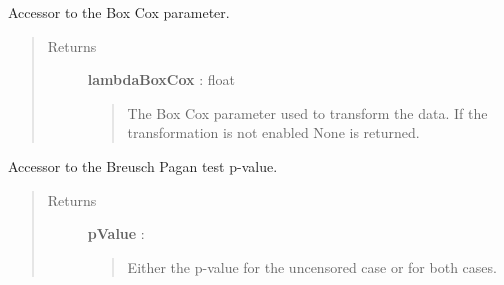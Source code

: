 \documentclass[letterpaper,10pt,english]{sphinxmanual}
\begin{document}
\begin{fulllineitems}
\begin{fulllineitems}
\end{fulllineitems}


\begin{fulllineitems}
\label{_generated/otpod.UnivariateLinearModelAnalysis:otpod.UnivariateLinearModelAnalysis.getBoxCoxParameter}
Accessor to the Box Cox parameter.
\begin{quote}\begin{description}
\item[{Returns}] \leavevmode
\textbf{lambdaBoxCox} : float
\begin{quote}

The Box Cox parameter used to transform the data. If the transformation
is not enabled None is returned.
\end{quote}

\end{description}\end{quote}

\end{fulllineitems}


\begin{fulllineitems}
\label{_generated/otpod.UnivariateLinearModelAnalysis:otpod.UnivariateLinearModelAnalysis.getBreuschPaganPValue}
Accessor to the Breusch Pagan test p-value.
\begin{quote}\begin{description}
\item[{Returns}] \leavevmode
\textbf{pValue} : \href{http://doc.openturns.org/openturns-latest/sphinx/user\_manual/\_generated/openturns.NumericalPoint.html\#openturns.NumericalPoint}{}
\begin{quote}

Either the p-value for the uncensored case or for both cases.
\end{quote}

\end{description}\end{quote}

\end{fulllineitems}



\end{fulllineitems}
\end{document}
